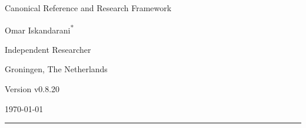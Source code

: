 \documentclass[11pt]{article}
\theoremstyle{definition}
\theoremstyle{plain}
\theoremstyle{remark}
\begin{document}
    
    \thispagestyle{empty}

    \begin{center}
        \vspace*{0.06\textheight}

        {\LARGE\bfseries \papertitle\par}
        \vspace{0.45cm}

        {\large Canonical Reference and Research Framework\par}
        \vspace{1.0cm}

        {\Large Omar Iskandarani\textsuperscript{*}\par}
        \vspace{0.35cm}

        {\normalsize Independent Researcher\par}
        {\normalsize Groningen, The Netherlands\par}
        \vspace{0.6cm}

        {\normalsize Version v0.8.20\par}
        {\normalsize \today\par}
        \vspace{0.9cm}

        \rule{0.82\textwidth}{0.5pt}
        \vspace{0.7cm}
    \end{center}

    \begin{abstract}
        \noindent
        This document presents Swirl-String Theory (SST) as a structured canonical synthesis rather than as a claim that every phenomenological sector has already been derived to theorem level. The text consolidates the primitive constant chain linking the effective fluid density, characteristic swirl speed, Compton anchoring, and horn/circulation scale; records delay-induced mode selection as the preferred non-operator route to spectral discreteness; and organizes the atomic bridge, spectroscopic filter, relational-time sector, and topology-based mass program within one explicitly stratified framework. Throughout, orthodox inputs, SST-internal derivations, bridge-level constructions, and conjectural extensions are kept distinct so that the canon remains internally coherent, externally comparable, and open to falsification.
    \end{abstract}
\end{document}
